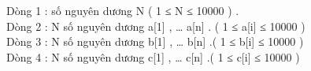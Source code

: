 Dòng 1 : số nguyên dương N ( 1 ≤ N ≤ 10000 ) .   
\\   Dòng 2 : N số nguyên dương a[1] , … a[n] . ( 1 ≤ a[i] ≤ 10000 )   
\\   Dòng 3 : N số nguyên dương b[1] , … b[n] .( 1 ≤ b[i] ≤ 10000 )   
\\   Dòng 4 : N số nguyên dương c[1] , … c[n] .( 1 ≤ c[i] ≤ 10000 )